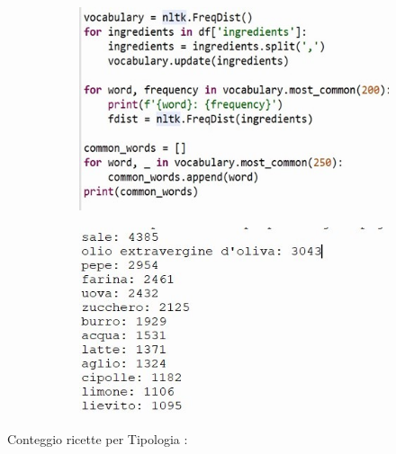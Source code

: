 \documentclass[12pt]{report}
\begin{document}
\begin{figure}[H]
  \centering
  \begin{subfigure}[b]{0.45\linewidth}
    \includegraphics[width=\linewidth]{img/img6.jpg}
  \end{subfigure}
  \begin{subfigure}[b]{0.45\linewidth}
    \includegraphics[width=\linewidth]{img/img7.jpg}
  \end{subfigure}
\end{figure}

Conteggio ricette per Tipologia :
\end{document}
